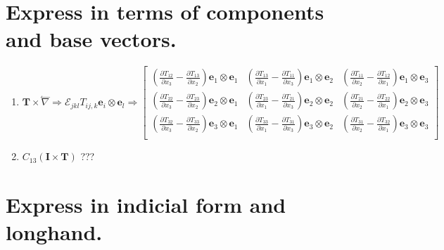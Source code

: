 \documentclass[10pt, letterpaper]{article}
\begin{document}
\section{Express in terms of components and base vectors.}
	\begin{enumerate}[label = (\roman*)]
	\item $\bm{T} \times \overset{\leftharpoonup}{\nabla} \Rightarrow \mathcal{E}_{jkl} T_{ij,k} \bm{e}_i \otimes \bm{e}_l 
		\Rightarrow \begin{bmatrix}
			\left( \frac{\partial T_{12}}{\partial x_3} - \frac{\partial T_{13}}{\partial x_2} \right) \bm{e}_1 \otimes \bm{e}_1 &
			\left( \frac{\partial T_{13}}{\partial x_1} - \frac{\partial T_{11}}{\partial x_3} \right) \bm{e}_1 \otimes \bm{e}_2 &
			\left( \frac{\partial T_{11}}{\partial x_2} - \frac{\partial T_{12}}{\partial x_1} \right) \bm{e}_1 \otimes \bm{e}_3 \\
			
			\left( \frac{\partial T_{22}}{\partial x_3} - \frac{\partial T_{23}}{\partial x_2} \right) \bm{e}_2 \otimes \bm{e}_1 &
			\left( \frac{\partial T_{23}}{\partial x_1} - \frac{\partial T_{21}}{\partial x_3} \right) \bm{e}_2 \otimes \bm{e}_2 &
			\left( \frac{\partial T_{21}}{\partial x_2} - \frac{\partial T_{22}}{\partial x_1} \right) \bm{e}_2 \otimes \bm{e}_3 \\
			
			\left( \frac{\partial T_{32}}{\partial x_3} - \frac{\partial T_{33}}{\partial x_2} \right) \bm{e}_3 \otimes \bm{e}_1 &
			\left( \frac{\partial T_{33}}{\partial x_1} - \frac{\partial T_{31}}{\partial x_3} \right) \bm{e}_3 \otimes \bm{e}_2 &
			\left( \frac{\partial T_{31}}{\partial x_2} - \frac{\partial T_{32}}{\partial x_1} \right) \bm{e}_3 \otimes \bm{e}_3 \\
		\end{bmatrix}$
		
	\item $C_{13}(\bm{I} \times \bm{T})$ ???
	\end{enumerate}

\section{Express in indicial form and longhand.}
\end{document}
